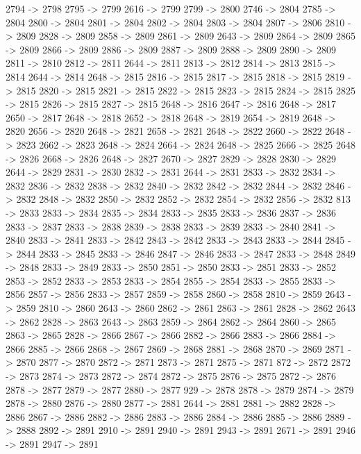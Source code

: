 {	2794 -> 2798
	2795 -> 2799
	2616 -> 2799
	2799 -> 2800
	2746 -> 2804
	2785 -> 2804
	2800 -> 2804
	2801 -> 2804
	2802 -> 2804
	2803 -> 2804
	2807 -> 2806
	2810 -> 2809
	2828 -> 2809
	2858 -> 2809
	2861 -> 2809
	2643 -> 2809
	2864 -> 2809
	2865 -> 2809
	2866 -> 2809
	2886 -> 2809
	2887 -> 2809
	2888 -> 2809
	2890 -> 2809
	2811 -> 2810
	2812 -> 2811
	2644 -> 2811
	2813 -> 2812
	2814 -> 2813
	2815 -> 2814
	2644 -> 2814
	2648 -> 2815
	2816 -> 2815
	2817 -> 2815
	2818 -> 2815
	2819 -> 2815
	2820 -> 2815
	2821 -> 2815
	2822 -> 2815
	2823 -> 2815
	2824 -> 2815
	2825 -> 2815
	2826 -> 2815
	2827 -> 2815
	2648 -> 2816
	2647 -> 2816
	2648 -> 2817
	2650 -> 2817
	2648 -> 2818
	2652 -> 2818
	2648 -> 2819
	2654 -> 2819
	2648 -> 2820
	2656 -> 2820
	2648 -> 2821
	2658 -> 2821
	2648 -> 2822
	2660 -> 2822
	2648 -> 2823
	2662 -> 2823
	2648 -> 2824
	2664 -> 2824
	2648 -> 2825
	2666 -> 2825
	2648 -> 2826
	2668 -> 2826
	2648 -> 2827
	2670 -> 2827
	2829 -> 2828
	2830 -> 2829
	2644 -> 2829
	2831 -> 2830
	2832 -> 2831
	2644 -> 2831
	2833 -> 2832
	2834 -> 2832
	2836 -> 2832
	2838 -> 2832
	2840 -> 2832
	2842 -> 2832
	2844 -> 2832
	2846 -> 2832
	2848 -> 2832
	2850 -> 2832
	2852 -> 2832
	2854 -> 2832
	2856 -> 2832
	813 -> 2833
	2833 -> 2834
	2835 -> 2834
	2833 -> 2835
	2833 -> 2836
	2837 -> 2836
	2833 -> 2837
	2833 -> 2838
	2839 -> 2838
	2833 -> 2839
	2833 -> 2840
	2841 -> 2840
	2833 -> 2841
	2833 -> 2842
	2843 -> 2842
	2833 -> 2843
	2833 -> 2844
	2845 -> 2844
	2833 -> 2845
	2833 -> 2846
	2847 -> 2846
	2833 -> 2847
	2833 -> 2848
	2849 -> 2848
	2833 -> 2849
	2833 -> 2850
	2851 -> 2850
	2833 -> 2851
	2833 -> 2852
	2853 -> 2852
	2833 -> 2853
	2833 -> 2854
	2855 -> 2854
	2833 -> 2855
	2833 -> 2856
	2857 -> 2856
	2833 -> 2857
	2859 -> 2858
	2860 -> 2858
	2810 -> 2859
	2643 -> 2859
	2810 -> 2860
	2643 -> 2860
	2862 -> 2861
	2863 -> 2861
	2828 -> 2862
	2643 -> 2862
	2828 -> 2863
	2643 -> 2863
	2859 -> 2864
	2862 -> 2864
	2860 -> 2865
	2863 -> 2865
	2828 -> 2866
	2867 -> 2866
	2882 -> 2866
	2883 -> 2866
	2884 -> 2866
	2885 -> 2866
	2868 -> 2867
	2869 -> 2868
	2881 -> 2868
	2870 -> 2869
	2871 -> 2870
	2877 -> 2870
	2872 -> 2871
	2873 -> 2871
	2875 -> 2871
	872 -> 2872
	2872 -> 2873
	2874 -> 2873
	2872 -> 2874
	2872 -> 2875
	2876 -> 2875
	2872 -> 2876
	2878 -> 2877
	2879 -> 2877
	2880 -> 2877
	929 -> 2878
	2878 -> 2879
	2874 -> 2879
	2878 -> 2880
	2876 -> 2880
	2877 -> 2881
	2644 -> 2881
	2881 -> 2882
	2828 -> 2886
	2867 -> 2886
	2882 -> 2886
	2883 -> 2886
	2884 -> 2886
	2885 -> 2886
	2889 -> 2888
	2892 -> 2891
	2910 -> 2891
	2940 -> 2891
	2943 -> 2891
	2671 -> 2891
	2946 -> 2891
	2947 -> 2891
}
